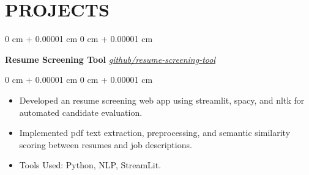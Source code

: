 \documentclass[10pt, letterpaper]{article}
\newenvironment{highlights}{
    \begin{itemize}[
        topsep=0.10 cm,
        parsep=0.10 cm,
        partopsep=0pt,
        itemsep=0pt,
        leftmargin=0 cm + 10pt
    ]
}{
    \end{itemize}
} %
\newenvironment{onecolentry}{
    \begin{adjustwidth}{
        0 cm + 0.00001 cm
    }{
        0 cm + 0.00001 cm
    }
}{
    \end{adjustwidth}
} %
\newenvironment{twocolentry}[2][]{
    \onecolentry
    \def\secondColumn{#2}
    \setcolumnwidth{\fill, 4.5 cm}
    \begin{paracol}{2}
}{
    \switchcolumn \raggedleft \secondColumn
    \end{paracol}
    \endonecolentry
} %
\begin{document}
    \section{PROJECTS}



        
        \begin{twocolentry}{
           {\color{blue} \href{https://github.com/dinesh-n-06/resume-screening-tool}{\textit{github/resume-screening-tool}}
        }}
            \textbf{Resume Screening Tool}\end{twocolentry}

        \vspace{0.10 cm}
        \begin{onecolentry}
            \begin{highlights}
                \item Developed an resume screening web app using streamlit, spacy, and nltk for automated candidate evaluation.
                \item Implemented pdf text extraction, preprocessing, and semantic similarity scoring between resumes and job descriptions.
                \item Tools Used: Python, NLP, StreamLit.
                
            \end{highlights}
        \end{onecolentry}




\end{document}

